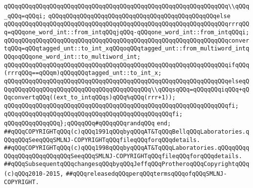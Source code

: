 \verb|qQQqqQQqqQQqqQQqqQQqqQQqqQQqqQQqqQQqqQQqqQQqqQQqqQQqqQQqqQQqqQQq\\qQQq_qQQq=qQQqi;|\newline
\verb|qQQqqQQqqQQqqQQqqQQqqQQqqQQqqQQqqQQqqQQqqQQqqQQqelse|\newline
\verb|qQQqqQQqqQQqqQQqqQQqqQQqqQQqqQQqqQQqqQQqqQQqqQQqqQQqqQQqqQQqqQQqrrrqQQq=qQQqone_word_int::from_intqQQqjqQQq-qQQqone_word_int::from_intqQQqi;|\newline
\newline
\verb|qQQqqQQqqQQqqQQqqQQqqQQqqQQqqQQqqQQqqQQqqQQqqQQqqQQqqQQqqQQqqQQqconvertqQQq=qQQqtagged_unt::to_int_xqQQqoqQQqtagged_unt::from_multiword_intqQQqoqQQqone_word_int::to_multiword_int;|\newline
\newline
\verb|qQQqqQQqqQQqqQQqqQQqqQQqqQQqqQQqqQQqqQQqqQQqqQQqqQQqqQQqqQQqqQQqifqQQq(rrrqQQq==qQQqm)qQQqqQQqtagged_unt::to_int_x;|\newline
\verb|qQQqqQQqqQQqqQQqqQQqqQQqqQQqqQQqqQQqqQQqqQQqqQQqqQQqqQQqqQQqqQQqelseqQQqqQQqqQQqqQQqqQQqqQQqqQQqqQQqqQQqqQQqqQQq\\qQQqsqQQq=qQQqqQQqiqQQq+qQQqconvertqQQq((ext_to_intqQQqs)qQQq%qQQq(rrr+1));|\newline
\verb|qQQqqQQqqQQqqQQqqQQqqQQqqQQqqQQqqQQqqQQqqQQqqQQqqQQqqQQqqQQqqQQqfi;|\newline
\verb|qQQqqQQqqQQqqQQqqQQqqQQqqQQqqQQqqQQqqQQqqQQqqQQqfi;|\newline
\newline
\verb|qQQqqQQqqQQqqQQq};qQQqqQQq#qQQqqQQqrandqQQq|\newline
\verb|end;|\newline
\newline
\newline
\verb|##qQQqCOPYRIGHTqQQq(c)qQQq1991qQQqbyqQQqAT&TqQQqBellqQQqLaboratories.qQQqqQQqSeeqQQqSMLNJ-COPYRIGHTqQQqfileqQQqforqQQqdetails.|\newline
\verb|##qQQqCOPYRIGHTqQQq(c)qQQq1998qQQqbyqQQqAT&TqQQqLaboratories.qQQqqQQqqQQqqQQqqQQqqQQqqQQqSeeqQQqSMLNJ-COPYRIGHTqQQqfileqQQqforqQQqdetails.|\newline
\verb|##qQQqSubsequentqQQqchangesqQQqbyqQQqJeffqQQqProtheroqQQqCopyrightqQQq(c)qQQq2010-2015,|\newline
\verb|##qQQqreleasedqQQqperqQQqtermsqQQqofqQQqSMLNJ-COPYRIGHT.|\newline

